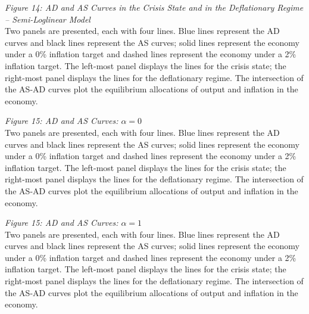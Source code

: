 \documentclass[11pt]{article}
\begin{document}
	\noindent \emph{Figure 14: AD and AS Curves in the Crisis State and in the Deflationary Regime -- Semi-Loglinear Model}\\
	\noindent Two panels are presented, each with four lines. Blue lines represent the AD curves and black lines represent the AS curves; solid lines represent the economy under a 0\% inflation target and dashed lines represent the economy under a 2\% inflation target. The left-most panel displays the lines for the crisis state; the right-most panel displays the lines for the deflationary regime. The intersection of the AS-AD curves plot the equilibrium allocations of output and inflation in the economy.  \vspace{0.5cm}
	
	\noindent \emph{Figure 15: AD and AS Curves: $\alpha = 0$}\\
	\noindent Two panels are presented, each with four lines. Blue lines represent the AD curves and black lines represent the AS curves; solid lines represent the economy under a 0\% inflation target and dashed lines represent the economy under a 2\% inflation target. The left-most panel displays the lines for the crisis state; the right-most panel displays the lines for the deflationary regime. The intersection of the AS-AD curves plot the equilibrium allocations of output and inflation in the economy.  \vspace{0.5cm}
	
	\noindent \emph{Figure 15: AD and AS Curves: $\alpha = 1$}\\
	\noindent Two panels are presented, each with four lines. Blue lines represent the AD curves and black lines represent the AS curves; solid lines represent the economy under a 0\% inflation target and dashed lines represent the economy under a 2\% inflation target. The left-most panel displays the lines for the crisis state; the right-most panel displays the lines for the deflationary regime. The intersection of the AS-AD curves plot the equilibrium allocations of output and inflation in the economy.  \vspace{0.5cm}
	
	
\end{document}

